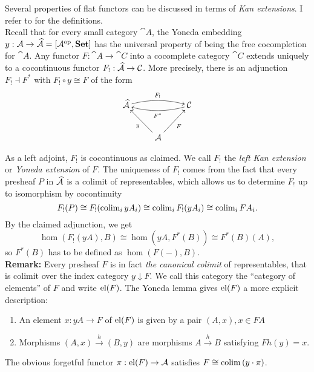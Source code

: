 Several properties of flat functors can be discussed in terms of \emph{Kan extensions}. I refer to \cite[\nopp~8.11,\nopp~9.16]{Awodey} for the definitions. \\

Recall that for every small category $\cat A$, the Yoneda embedding $y : \mathcal{A} \to \widehat{\mathcal{A}}=[\mathcal{A}^{\textrm{op}},\mathbf{Set}]$ has the universal property of being the free cocompletion for $\cat A$. Any functor $F : \cat A \to \cat C$ into a cocomplete category $\cat C$ extends uniquely to a cocontinuous functor $F_!: \widehat{\mathcal{A}} \to \mathcal{C}$. More precisely, there is an adjunction $F_! \dashv F^*$ with $F_! \circ y \cong F$ of the form
\[
\xymatrix{
\pre{\cat A} \ar@/^/[rr]^{F_!} & & \cat C \ar@/^/[ll]^{F^*} \\
& \cat A \ar[lu]^{y} \ar[ru]_{F}
}\]

As a left adjoint, $F_!$ is cocontinuous as claimed. We call $F_!$ the \emph{left Kan extension} or \emph{Yoneda extension} of $F$. The uniqueness of $F_!$ comes from the fact that every presheaf $P$ in $\widehat{\mathcal{A}}$ is a colimit of representables, which allows us to determine $F_!$ up to isomorphism by cocontinuity
\[ F_!(P) \cong F_!(\operatorname{colim}_i yA_i) \cong \operatorname{colim}_i F_!(yA_i) \cong \operatorname{colim}_i FA_i. \]
By the claimed adjunction, we get
\[ \hom(F_!(yA),B) \cong \hom(yA,F^*(B)) \cong F^*(B)(A), \]
so $F^*(B)$ has to be defined as $\hom(F(-),B)$. \\ 

\textbf{Remark:} Every presheaf $F$ is in fact \emph{the canonical colimit} of representables, that is colimit over the index category $y \downarrow F$. We call this category the ``category of elements'' of $F$ and write $\textrm{el}(F)$. The Yoneda lemma gives $\textrm{el}(F)$ a more explicit description:
\begin{enumerate}
\item An element $x : yA \to F$ of $\textrm{el}(F)$ is given by a pair $(A,x), x \in FA$
\item Morphisms $(A,x) \xrightarrow{h} (B,y)$ are morphisms $A \xrightarrow{h} B$ satisfying $Fh(y) = x$.
\end{enumerate}
The obvious forgetful functor $\pi : \textrm{el}(F) \to \mathcal{A}$ satisfies $F \cong \operatorname{colim}\, (y\cdot \pi)$. \\

